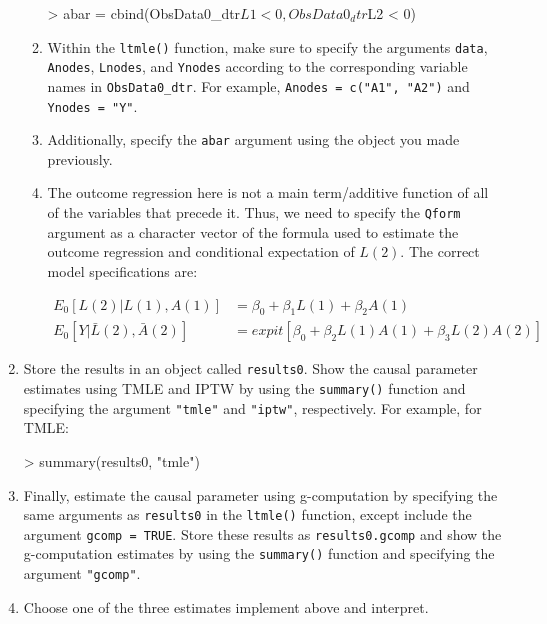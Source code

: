 \documentclass[answers]{exam}
\begin{document}
\begin{enumerate}
\begin{enumerate}
\begin{Schunk}
\begin{Sinput}
> abar = cbind(ObsData0_dtr$L1 < 0, ObsData0_dtr$L2 < 0)
\end{Sinput}
\end{Schunk}
\item Within the \texttt{ltmle()} function, make sure to specify the arguments \texttt{data}, \texttt{Anodes}, \texttt{Lnodes}, and \texttt{Ynodes} according to the corresponding variable names in \texttt{ObsData0\_dtr}. For example, \texttt{Anodes = c("A1", "A2")} and \texttt{Ynodes = "Y"}.
\item Additionally, specify the \texttt{abar} argument using the object you made previously.
\item The outcome regression here is not a main term/additive function of all of the variables that precede it. Thus, we need to specify the \texttt{Qform} argument as a character vector of the formula used to estimate the outcome regression and conditional expectation of $L(2)$. The correct model specifications are: 

\begin{align*}
E_0[L(2)|L(1), A(1)] & = \beta_0 + \beta_1L(1) + \beta_2A(1) \\
E_0[Y|\bar{L}(2), \bar{A}(2)] & = expit[\beta_0 + \beta_2L(1)A(1) + \beta_3L(2)A(2)] 
\end{align*}

\end{enumerate}
\item Store the results in an object called \texttt{results0}. Show the causal parameter estimates using TMLE and IPTW by using the \texttt{summary()} function and specifying the argument \texttt{"tmle"} and \texttt{"iptw"}, respectively. For example, for TMLE:
\begin{Schunk}
\begin{Sinput}
> summary(results0, "tmle")
\end{Sinput}
\end{Schunk}
\item Finally, estimate the causal parameter using g-computation by specifying the same arguments as \texttt{results0} in the \texttt{ltmle()} function, except include the argument \texttt{gcomp = TRUE}. Store these results as \texttt{results0.gcomp} and show the g-computation estimates by using the \texttt{summary()} function and specifying the argument \texttt{"gcomp"}.
\item Choose one of the three estimates implement above and interpret.
\end{enumerate}
\end{document}
